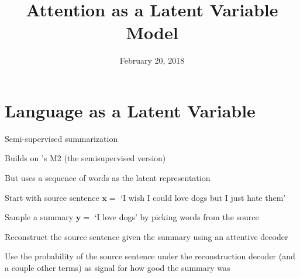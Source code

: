 \documentclass{beamer}
\title[latent]{Attention as a Latent Variable Model}
\author[Yoon Kim]{February 20, 2018}
\institute[Harvard SEAS]{ 
{ }


}
\date{}
\let\tempone\itemize
\let\temptwo\enditemize
\renewenvironment{itemize}{\tempone\addtolength{\itemsep}{0.5\baselineskip}}{\temptwo}
\newcommand{\bx}{\mathbf{x}}
\newcommand{\by}{\mathbf{y}}
\begin{document}
\begin{frame}
  \titlepage
\end{frame}

\begin{frame}
  \tableofcontents
\end{frame}
\section{Language as a Latent Variable}

\begin{frame}
  \begin{center}
   \end{center}   
   
\begin{itemize}
\item Semi-supervised summarization
\item Builds on \cite{kingma2014}'s M2 (the semisupervised version)
\item But uses a sequence of words as the latent representation
\end{itemize}
\end{frame}

\begin{frame}
\begin{center}
\end{center}
\begin{itemize}
\item Start with source sentence $\bx =$ `I wish I could love dogs but I just hate them'
\item Sample a summary $\by =$ `I love dogs' by picking words from the source
\item Reconstruct the source sentence given the summary using an attentive decoder
\item Use the probability of the source sentence under the reconstruction decoder
(and a couple other terms) as signal for how good the summary was
\end{itemize}
\end{frame}
\end{document}
